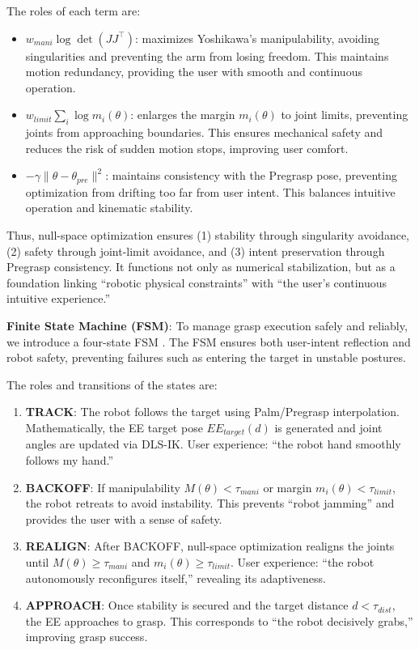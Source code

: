 \documentclass[../../main.tex]{subfiles} %
\begin{document}
The roles of each term are:
\begin{itemize}
  \item $w_{mani}\log\det(JJ^\top)$: maximizes Yoshikawa’s manipulability, 
  avoiding singularities and preventing the arm from losing freedom.  
  This maintains motion redundancy, providing the user with smooth and continuous operation.

  \item $w_{limit}\sum_i \log m_i(\theta)$: enlarges the margin $m_i(\theta)$ to 
  joint limits, preventing joints from approaching boundaries.  
  This ensures mechanical safety and reduces the risk of sudden motion stops, improving user comfort.

  \item $-\gamma\|\theta-\theta_{pre}\|^2$: maintains consistency with the Pregrasp pose, 
  preventing optimization from drifting too far from user intent.  
  This balances intuitive operation and kinematic stability.
\end{itemize}

Thus, null-space optimization ensures  
(1) stability through singularity avoidance,  
(2) safety through joint-limit avoidance, and  
(3) intent preservation through Pregrasp consistency.  
It functions not only as numerical stabilization, but as a foundation linking 
“robotic physical constraints” with “the user’s continuous intuitive experience.”  

\medskip
\textbf{Finite State Machine (FSM)}:  
To manage grasp execution safely and reliably, we introduce a four-state FSM \cite{}.  
The FSM ensures both user-intent reflection and robot safety, preventing failures such 
as entering the target in unstable postures.

The roles and transitions of the states are:

\begin{enumerate}
  \item \textbf{TRACK}:  
  The robot follows the target using Palm/Pregrasp interpolation.  
  Mathematically, the EE target pose $EE_{target}(d)$ is generated 
  and joint angles are updated via DLS-IK.  
  User experience: “the robot hand smoothly follows my hand.”

  \item \textbf{BACKOFF}:  
  If manipulability $M(\theta)<\tau_{mani}$ or margin $m_i(\theta)<\tau_{limit}$, 
  the robot retreats to avoid instability.  
  This prevents “robot jamming” and provides the user with a sense of safety.

  \item \textbf{REALIGN}:  
  After BACKOFF, null-space optimization realigns the joints 
  until $M(\theta)\geq \tau_{mani}$ and $m_i(\theta)\geq \tau_{limit}$.  
  User experience: “the robot autonomously reconfigures itself,” revealing its adaptiveness.

  \item \textbf{APPROACH}:  
  Once stability is secured and the target distance $d<\tau_{dist}$, 
  the EE approaches to grasp.  
  This corresponds to “the robot decisively grabs,” improving grasp success.
\end{enumerate}
\end{document}
